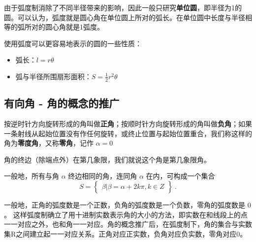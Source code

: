 由于弧度制消除了不同半径带来的影响，因此一般只研究\textbf{单位圆}，即半径为1的圆。可以认为，弧度就是圆心角在单位圆上所对的弧长。在单位圆中长度与半径相等的弧所对的圆心角就是1弧度。

使用弧度可以更容易地表示的圆的一些性质：
\begin{itemize}
\item 弧长：$l=r\theta$
\item 弧与半径所围扇形面积：$\displaystyle S=\frac{1}{2}r^2\theta$
\end{itemize}

\subsection{有向角 - 角的概念的推广}


按逆时针方向旋转形成的角叫做\textbf{正角}；按顺时针方向旋转形成的角叫做\textbf{负角}；如果一条射线从起始位置没有作任何旋转，或终止位置与起始位置重合，我们称这样的角为\textbf{零度角}，又称\textbf{零角}，记作 $\alpha = 0$

角的终边（除端点外）在第几象限，我们就说这个角是第几象限角。

一般地，所有与角 $\alpha$ 终边相同的角，连同角 $\alpha$ 在内，可构成一个集合
\begin{equation}
S = \begin{Bmatrix} \beta|\beta=\alpha+2k\pi,k \in Z \end{Bmatrix}~.
\end{equation}


一般地，正角的弧度数是一个正数，负角的弧度数是一个负数，零角的弧度数是 $0$。
这样弧度制确立了用十进制实数表示角的大小的方法，即实数在和线段上的点一一对应之外，也和角一一对应。角的概念推广后，在弧度制下，角的集合与实数集R之间建立起一一对应关系。正角对应正实数，负角对应负实数，零角对应0。